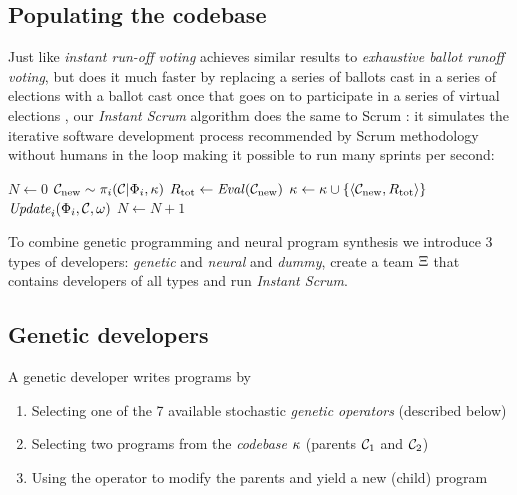 \newpage \subsection{Populating the codebase}

Just like \emph{instant run-off voting} achieves similar results to \emph{exhaustive ballot runoff voting}, but does it much faster by replacing a series of ballots cast in a series of elections with a ballot cast once that goes on to participate in a series of virtual elections \cite{devlinVotingSystemsMethod}, our \emph{Instant Scrum} algorithm does the same to Scrum \cite{schwaberAgileSoftwareDevelopment2002}: it simulates the iterative software development process recommended by Scrum methodology without humans in the loop making it possible to run many sprints per second:

\begin{algorithm}[H]
\begin{algorithmic}[1]
\caption{Instant Scrum with a team of developers}
\label{alg:instantscrum}
\State $N \gets 0$
\State $\mathcal{C}_\text{new}\sim \pi_i(\mathcal{C} | \Phi_i, \kappa)$ 
\State $R_\text{tot} \gets \mathit{Eval}(\mathcal{C}_\text{new})$
\State $\kappa \gets \kappa \cup \{\langle \mathcal{C}_\text{new}, R_\text{tot} \rangle\}$
\State $\mathit{Update}_i(\Phi_i, \mathcal{C}, \omega)$
\State $N \gets N+1$
\EndFor
\EndWhile
\EndProcedure
\end{algorithmic}
\end{algorithm}

To combine genetic programming and neural program synthesis we introduce 3 types of developers: \emph{genetic} and \emph{neural} and \emph{dummy}, create a team $\Xi$ that contains developers of all types and run \emph{Instant Scrum}.

\newpage \subsection{Genetic developers}
\label{sec:genetic}

A genetic developer writes programs by
\begin{enumerate}
    \item Selecting one of the 7 available stochastic \emph{genetic operators} (described below)
    \item Selecting two programs from the \emph{codebase} $\kappa$ (parents $\mathcal{C}_1$ and $\mathcal{C}_2$) 
    \item Using the operator to modify the parents and yield a new (child) program
\end{enumerate}


